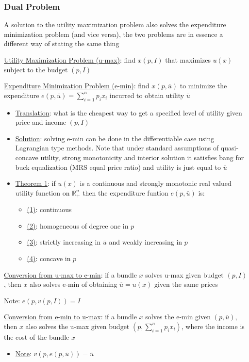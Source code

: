 \documentclass{article}
\begin{document}
\subsubsection{Dual Problem}
A solution to the utility maximization problem also solves the expenditure minimization problem (and vice versa), the two problems are in essence a different way of stating the same thing \par \vspace{0.3em}
  \underline{Utility Maximization Problem (u-max)}: find $x(p, I)$ that maximizes $u(x)$ subject to the budget $(p, I)$
  \par
  \underline{Expenditure Minimization Problem (e-min)}: find $x(p, \overline{u})$ to minimize the expenditure $e(p,\overline{u}) = \sum_{i=1}^{n}p_{i}x_{i}$ incurred to obtain utility $\overline{u}$
  \begin{itemize}
    \item  \underline{Translation}: what is the cheapest way to get a specified level of utility given price and income $(p, I)$
    \item  \underline{Solution}: solving e-min can be done in the differentiable case using Lagrangian type methods. Note that under standard assumptions of quasi-concave utility, strong monotonicity and interior solution it satisfies bang for buck equalization (MRS equal price ratio) and utility is just equal to $\overline{u}$
    \item  \underline{Theorem 1}: if $u(x)$ is a continuous and strongly monotonic real valued utility function on $\mathbb{R}_{+}^{n}$ then the expenditure funtion $e(p, \overline{u})$ is:
    \begin{itemize}
      \item  \underline{(1)}: continuous
      \item  \underline{(2)}: homogeneous of degree one in $p$
      \item  \underline{(3)}: strictly increasing in $\overline{u}$ and weakly increasing in $p$
      \item  \underline{(4)}: concave in $p$
    \end{itemize}
  \end{itemize}
  \par
  \underline{Conversion from u-max to e-min}: if a bundle $x$ solves u-max given budget $(p, I)$, then $x$ also solves e-min of obtaining $\overline{u} = u(x)$ given the same prices
  \begin{itemize}
    \underline{Note}: $e(p, v(p, I)) = I$
  \end{itemize}
  \par
  \underline{Conversion from e-min to u-max}: if a bundle $x$ solves the e-min given $(p, \overline{u})$, then $x$ also solves the u-max given budget $(p, \sum_{i=1}^{n}p_{i}x_{i})$, where the income is the cost of the bundle $x$
  \begin{itemize}
    \item  \underline{Note}: $v(p, e(p, \overline{u})) = \overline{u}$
  \end{itemize}
  \par
\vspace{6mm}
\end{document}
